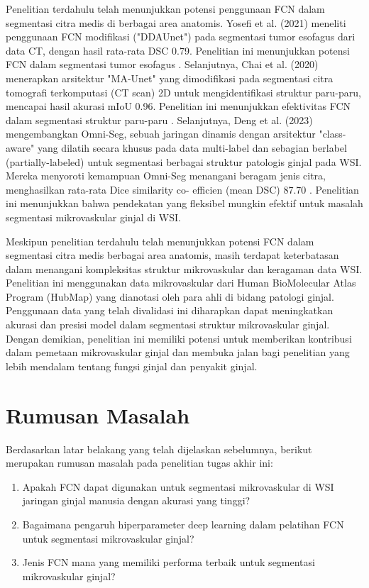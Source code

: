 \noindent Penelitian terdahulu telah menunjukkan potensi penggunaan FCN dalam segmentasi citra medis di berbagai area anatomis. Yosefi et al. (2021) meneliti penggunaan FCN modifikasi ("DDAUnet") pada segmentasi tumor esofagus dari data CT, dengan hasil rata-rata DSC 0.79. Penelitian ini menunjukkan potensi FCN dalam segmentasi tumor esofagus \cite{yousefi_esophageal_2021}. Selanjutnya, Chai et al. (2020) menerapkan arsitektur "MA-Unet" yang dimodifikasi pada segmentasi citra tomografi terkomputasi (CT scan) 2D untuk mengidentifikasi struktur paru-paru, mencapai hasil akurasi mIoU 0.96. Penelitian ini menunjukkan efektivitas FCN dalam segmentasi struktur paru-paru \cite{cai_ma-unet_2020}. Selanjutnya, Deng et al. (2023) mengembangkan Omni-Seg, sebuah jaringan dinamis dengan arsitektur "class-aware" yang dilatih secara khusus pada data multi-label dan sebagian berlabel (partially-labeled) untuk segmentasi berbagai struktur patologis ginjal pada WSI. Mereka menyoroti kemampuan Omni-Seg menangani beragam jenis citra, menghasilkan rata-rata Dice similarity co-
efficien (mean DSC) 87.70 \cite{deng_omni-seg_2022}. Penelitian ini menunjukkan bahwa pendekatan yang fleksibel mungkin efektif untuk masalah segmentasi mikrovaskular ginjal di WSI.

\noindent Meskipun penelitian terdahulu telah menunjukkan potensi FCN dalam segmentasi citra medis berbagai area anatomis, masih terdapat keterbatasan dalam menangani kompleksitas struktur mikrovaskular dan keragaman data WSI. Penelitian ini menggunakan data mikrovaskular dari Human BioMolecular Atlas Program (HubMap) yang dianotasi oleh para ahli di bidang patologi ginjal. Penggunaan data yang telah divalidasi ini diharapkan dapat meningkatkan akurasi dan presisi model dalam segmentasi struktur mikrovaskular ginjal. Dengan demikian, penelitian ini memiliki potensi untuk memberikan kontribusi dalam pemetaan mikrovaskular ginjal dan membuka jalan bagi penelitian yang lebih mendalam tentang fungsi ginjal dan penyakit ginjal. 

\section{Rumusan Masalah}
\noindent Berdasarkan latar belakang yang telah dijelaskan sebelumnya, berikut merupakan rumusan masalah pada penelitian tugas akhir ini:
\begin{enumerate}
    \item Apakah FCN dapat digunakan untuk segmentasi mikrovaskular di WSI jaringan ginjal manusia dengan akurasi yang tinggi?
    \item Bagaimana pengaruh hiperparameter deep learning dalam pelatihan FCN untuk segmentasi mikrovaskular ginjal?
    \item Jenis FCN mana yang memiliki performa terbaik untuk segmentasi mikrovaskular ginjal?
\end{enumerate}

